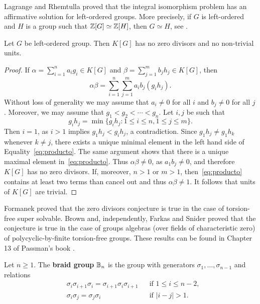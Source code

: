 Lagrange and Rhemtulla proved that the integral isomorphism problem 
has an affirmative solution for left-ordered groups. More precisely,
if $G$ is left-ordered and $H$ is a group such that $\mathbb{Z}[G]\simeq\mathbb{Z}[H]$, then
$G\simeq H$, see \cite{MR240183}.

\begin{theorem}
	Let $G$ be left-ordered group. Then $K[G]$ has no zero divisors 
	and no non-trivial units. 
\end{theorem}

\begin{proof}
	If $\alpha=\sum_{i=1}^na_ig_i\in K[G]$ and
	$\beta=\sum_{j=1}^mb_jh_j\in K[G]$, then 
	\begin{equation}
		\label{eq:producto}
		\alpha\beta=\sum_{i=1}^n\sum_{j=1}^ma_ib_j(g_ih_j).
	\end{equation}
	Without loss of generality we may assume that $a_i\ne 0$ for
	all $i$ and $b_j\ne 0$ for all $j$. Moreover, we may assume that 
	$g_1<g_2<\cdots<g_n$. Let $i,j$ be such that 
	\[
		g_ih_j=\min\{g_ih_j:1\leq i\leq n,1\leq j\leq m\}.
	\]
	Then $i=1$, as $i>1$ implies
	$g_1h_j<g_ih_j$, a contradiction. Since $g_1h_j\ne g_1h_k$ whenever 
	$k\ne j$, there exists a unique minimal element in the left hand side of Equality~\eqref{eq:producto}. The same argument shows that there is a unique
	maximal element in~\eqref{eq:producto}. Thus 
	$\alpha\beta\ne 0$, as $a_1b_j\ne 0$, and therefore $K[G]$ has no zero divisors. 
	If, moreover, $n>1$ or $m>1$, then~\eqref{eq:producto} contains at least two
	terms than cancel out and thus  
	$\alpha\beta\ne1$. It follows that units of $K[G]$ are trivial. 
\end{proof}

Formanek proved that the zero divisors conjecture is true 
in the case of torsion-free super solvable. Brown and, independently, 
Farkas and Snider proved that the conjecture is true 
in the case of groups algebras (over fields of characteristic zero) of 
polycyclic-by-finite torsion-free groups. These results
can be found in Chapter 13 of
Passman's book \cite{MR798076}. 


\begin{definition}
    Let $n\geq1$. The \textbf{braid group} $\mathbb{B}_n$ is
    the group with generators $\sigma_1,\dots,\sigma_{n-1}$ and
    relations
    \begin{align*}
        &\sigma_i\sigma_{i+1}\sigma_i=\sigma_{i+1}\sigma_i\sigma_{i+1} && \text{if }1\leq i\leq n-2,\\
        &\sigma_i\sigma_j=\sigma_j\sigma_i && \text{if }|i-j|> 1.
    \end{align*}
\end{definition}

